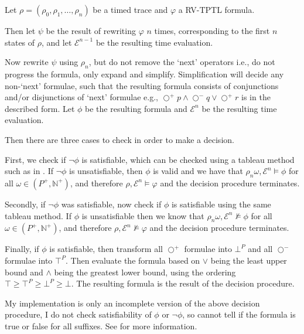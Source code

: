 \documentclass[a4paper]{article}
\newcommand{\sn}{\bigcirc^+}
\newcommand{\wn}{\bigcirc^-}
\newcommand{\eval}{\mathcal{E}}
\begin{document}
\begin{desc}[RV-TPTL]\label{decision}
  Let $\rho=(\rho_0,\rho_1,\dots,\rho_n)$ be a timed trace and $\varphi$ a RV-TPTL formula.

  Then let $\psi$ be the result of rewriting $\varphi$ $n$ times, corresponding to the first $n$ states of $\rho$, and let $\eval^{n-1}$ be the resulting time evaluation.

  Now rewrite $\psi$ using $\rho_n$, but do not remove the `next' operators i.e., do not progress the formula, only expand and simplify.
  Simplification will decide any non-`next' formulae, such that the resulting formula consists of conjunctions and/or disjunctions of `next' formulae e.g., $\sn p \land \wn q \lor \sn r$ is in the described form. Let $\phi$ be the resulting formula and $\eval^n$ be the resulting time evaluation.

  Then there are three cases to check in order to make a decision.

  First, we check if $\neg\phi$ is satisfiable, which can be checked using a tableau method such as in \textcite{alur1994really}. If $\neg\phi$ is unsatisfiable, then $\phi$ is valid and we have that $\rho_n\omega, \eval^n \vDash \phi$ for all $\omega\in (P^+,\mathbb{N}^+)$, and therefore $\rho,\eval^n \vDash \varphi$ and the decision procedure terminates.

  Secondly, if $\neg\phi$ was satisfiable, now check if $\phi$ is satisfiable using the same tableau method. If $\phi$ is unsatisfiable then we know that $\rho_n\omega, \eval^n \nvDash \phi$ for all $\omega\in (P^+,\mathbb{N}^+)$, and therefore $\rho,\eval^n \nvDash \varphi$ and the decision procedure terminates.

  Finally, if $\phi$ is satisfiable, then transform all $\sn$ formulae into $\bot^P$ and all $\wn$ formulae into $\top^P$. Then evaluate the formula based on $\lor$ being the least upper bound and $\land$ being the greatest lower bound, using the ordering $\top \geq \top^P \geq \bot^P \geq \bot$. The resulting formula is the result of the decision procedure.
\end{desc}

My implementation is only an incomplete version of the above decision procedure, I do not check satisfiability of $\phi$ or $\neg\phi$, so cannot tell if the formula is true or false for all suffixes. See  for more information.
\end{document}
